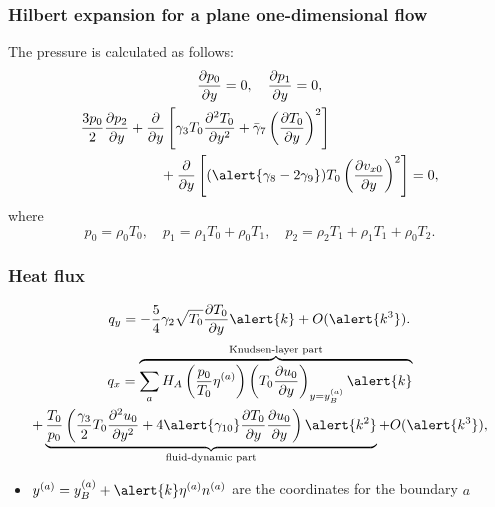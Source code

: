 \documentclass[mathserif]{beamer} %
\newcommand{\pder}[2][]{\frac{\partial#1}{\partial#2}}
\newcommand{\pderdual}[2][]{\frac{\partial^2#1}{\partial#2^2}}
\newcommand{\OO}[1]{O(#1)}
\begin{document}
\begin{frame}
    \frametitle{Hilbert expansion for a plane one-dimensional flow}
    The pressure is calculated as follows:
    \begin{gather}
        \pder[p_0]{y} = 0, \quad \pder[p_1]{y} = 0, \label{eq:hilbert_p0_p1} \\
        \begin{multlined}[][9cm]
        \frac{3p_0}{2}\pder[p_2]{y}
            + \pder{y}\left[ \gamma_3 T_0 \pderdual[T_0]{y} + \bar{\gamma}_7\left(\pder[T_0]{y}\right)^2 \right] \\
            + \pder{y}\left[ (\alert{\gamma_8-2\gamma_9})T_0\left(\pder[v_{x0}]{y}\right)^2 \right] = 0, \label{eq:hilbert_p2}
        \end{multlined}
    \end{gather}
    where
    \begin{equation}\label{eq:hilbert_expansion_p}
        p_0 = \rho_0 T_0, \quad
        p_1 = \rho_1 T_0 + \rho_0 T_1, \quad
        p_2 = \rho_2 T_1 + \rho_1 T_1 + \rho_0 T_2.
    \end{equation}
\end{frame}

\begin{frame}
    \frametitle{Heat flux}
    \begin{equation}\label{eq:Hilbert_Qy}
        q_y = -\frac54\gamma_2\sqrt{T_0}\pder[T_0]{y}\alert{k} + \OO{\alert{k^3}}.
    \end{equation}
    \pause
    \begin{multline}
        q_x = \overbrace{\sum_a H_A\left(\frac{p_0}{T_0}\eta^{(a)}\right)\left(T_0\pder[u_0]{y}\right)_{y=y_B^{(a)}}\alert{k}}
            ^\text{Knudsen-layer part} \\
            + \underbrace{\frac{T_0}{p_0}\left(\frac{\gamma_3}2 T_0 \pderdual[u_0]{y}
            + 4\alert{\gamma_{10}} \pder[T_0]{y}\pder[u_0]{y}\right)\alert{k^2}}
            _\text{fluid-dynamic part} + \OO{\alert{k^3}}, \label{eq:Hilbert_Qx}
    \end{multline}

    \begin{itemize}
        \item \(y^{(a)} = y_B^{(a)} + \alert{k}\eta^{(a)} n^{(a)}\) are the coordinates for the boundary \(a\)
    \end{itemize}
\end{frame}
\end{document}
